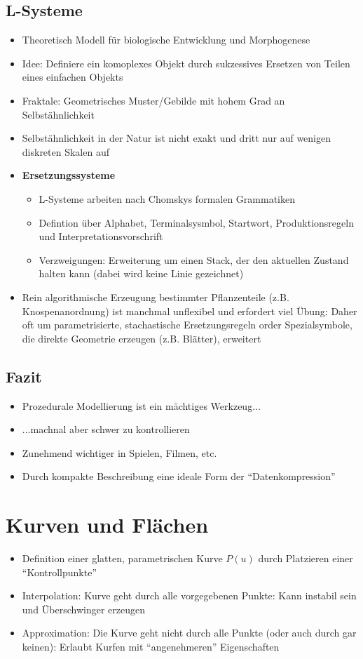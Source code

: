 \subsection{L-Systeme}
\begin{itemize}
	\item Theoretisch Modell für biologische Entwicklung und Morphogenese
	\item Idee: Definiere ein komoplexes Objekt durch sukzessives Ersetzen von Teilen eines einfachen Objekts
	\item Fraktale: Geometrisches Muster/Gebilde mit hohem Grad an Selbstähnlichkeit
	\item Selbstähnlichkeit in der Natur ist nicht exakt und dritt nur auf wenigen diskreten Skalen auf
	\item \textbf{Ersetzungssysteme}
	\begin{itemize}
		\item L-Systeme arbeiten nach Chomskys formalen Grammatiken
		\item Defintion über Alphabet, Terminalsysmbol, Startwort, Produktionsregeln und Interpretationsvorschrift
		\item Verzweigungen: Erweiterung um einen Stack, der den aktuellen Zustand halten kann (dabei wird keine Linie gezeichnet)
	\end{itemize}
	\item Rein algorithmische Erzeugung bestimmter Pflanzenteile (z.B. Knospenanordnung) ist manchmal unflexibel und erfordert viel Übung: Daher oft um parametrisierte, stachastische Ersetzungsregeln order Spezialsymbole, die direkte Geometrie erzeugen (z.B. Blätter), erweitert
\end{itemize}


\subsection{Fazit}
\begin{itemize}
	\item Prozedurale Modellierung ist ein mächtiges Werkzeug...
	\item ...machnal aber schwer zu kontrollieren
	\item Zunehmend wichtiger in Spielen, Filmen, etc.
	\item Durch kompakte Beschreibung eine ideale Form der "`Datenkompression"'
\end{itemize}



\section{Kurven und Flächen}
\begin{itemize}
	\item Definition einer glatten, parametrischen Kurve \(P(u)\) durch Platzieren einer "`Kontrollpunkte"'
	\item Interpolation: Kurve geht durch alle vorgegebenen Punkte: Kann instabil sein und Überschwinger erzeugen
	\item Approximation: Die Kurve geht nicht durch alle Punkte (oder auch durch gar keinen): Erlaubt Kurfen mit "`angenehmeren"' Eigenschaften
\end{itemize}

